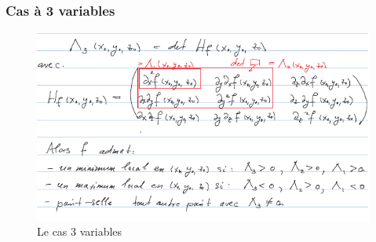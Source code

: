 \documentclass[12pt,a4paper]{article}
\renewcommand{\)}{\right)}
\renewcommand{\(}{\left(}
\begin{document}
\subsubsection{Cas à 3 variables}
\begin{figure}[!h]
	\centering
	\includegraphics[scale=0.7]{cas_3}
	\caption{Le cas 3 variables}
\end{figure}
\end{document}
